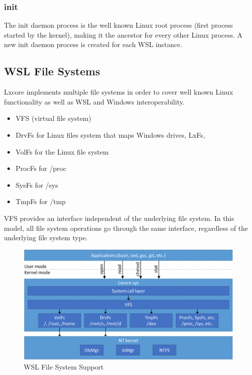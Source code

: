             \subsubsection{init}
            The init daemon process is the well known Linux root process (first process started by the kernel), making it the ancestor for
            every other Linux process. A new init daemon process is created for each WSL instance.


        \subsection{WSL File Systems}
            Lxcore implements multiple file systems in order to cover well known Linux functionality as well as WSL and Windows interoperability.


            \begin{itemize}
                \item VFS (virtual file system)
                \item DrvFs for Linux files system that maps Windows drives, LxFs, 
                \item VolFs for the Linux file system
                \item ProcFs for /proc
                \item SysFs for /sys
                \item TmpFs for /tmp
            \end{itemize}

            VFS provides an interface independent of the underlying file system. In this model, all file system operations go through the
            same interface, regardless of the underlying file system type\cite{TheArtOfMemoryForensics}.

            \begin{figure}[H]
                \includegraphics[width=\linewidth]{img/wsl_file_system.png}
                \caption{WSL File System Support \protect\cite{WSLFS}}
                \label{fig:wsl_file_system}
            \end{figure}

